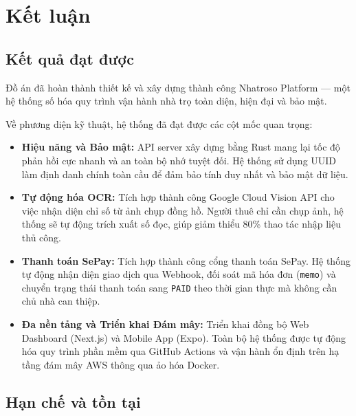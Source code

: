 \chapter{Kết luận}\label{chapter_conclusion}

\section{Kết quả đạt được}

Đồ án đã hoàn thành thiết kế và xây dựng thành công Nhatroso Platform --- một hệ thống số hóa quy trình vận hành nhà trọ toàn diện, hiện đại và bảo mật.

Về phương diện kỹ thuật, hệ thống đã đạt được các cột mốc quan trọng:
\begin{itemize}
    \item \textbf{Hiệu năng và Bảo mật:} API server xây dựng bằng Rust mang lại tốc độ phản hồi cực nhanh và an toàn bộ nhớ tuyệt đối. Hệ thống sử dụng UUID làm định danh chính toàn cầu để đảm bảo tính duy nhất và bảo mật dữ liệu.
    \item \textbf{Tự động hóa OCR:} Tích hợp thành công Google Cloud Vision API cho việc nhận diện chỉ số từ ảnh chụp đồng hồ. Người thuê chỉ cần chụp ảnh, hệ thống sẽ tự động trích xuất số đọc, giúp giảm thiểu 80\% thao tác nhập liệu thủ công.
    \item \textbf{Thanh toán SePay:} Tích hợp thành công cổng thanh toán SePay. Hệ thống tự động nhận diện giao dịch qua Webhook, đối soát mã hóa đơn (\texttt{memo}) và chuyển trạng thái thanh toán sang \texttt{PAID} theo thời gian thực mà không cần chủ nhà can thiệp.
    \item \textbf{Đa nền tảng và Triển khai Đám mây:} Triển khai đồng bộ Web Dashboard (Next.js) và Mobile App (Expo). Toàn bộ hệ thống được tự động hóa quy trình phần mềm qua GitHub Actions và vận hành ổn định trên hạ tầng đám mây AWS thông qua ảo hóa Docker.
\end{itemize}

\section{Hạn chế và tồn tại}

